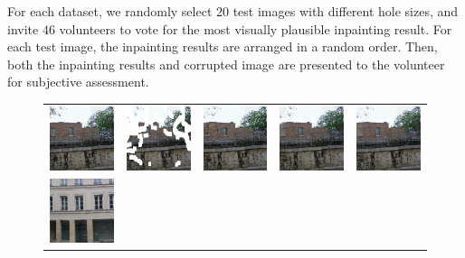 \documentclass[10pt,journal,compsoc]{IEEEtran}
\begin{document}
For each dataset, we randomly select $20$ test images with different hole sizes, and invite $46$ volunteers to vote for the most visually plausible inpainting result.
%
For each test image, the inpainting results are arranged in a random order.
%
Then, both the inpainting results and corrupted image are presented to the volunteer for subjective assessment.
%
\begin{figure}[hbt]
	\setlength{\tabcolsep}{2.0pt}
	\centering
	\begin{tabular}{ccccc}
		\includegraphics[width=.18\linewidth]{compare_variants/GT4-1}  &
		\includegraphics[width=.18\linewidth]{compare_variants/input4-1}  &
		\includegraphics[width=.18\linewidth]{compare_variants/gc4-1}  &
		\includegraphics[width=.18\linewidth]{compare_variants/ec4-1}  &
		\includegraphics[width=.18\linewidth]{compare_variants/ours4-1} \\
		\includegraphics[width=.18\linewidth]{compare_variants/GT47-0}  &

\end{tabular}
\end{figure}
\end{document}
